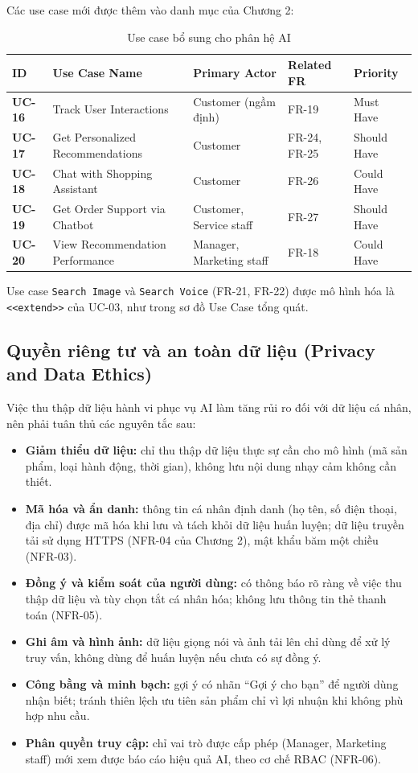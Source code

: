 \documentclass[12pt,a4paper,oneside]{report}
\begin{document}
Các use case mới được thêm vào danh mục của Chương 2:

\begin{longtable}{p{1.6cm}p{5.4cm}p{3.4cm}p{3cm}p{2.6cm}}
\caption{Use case bổ sung cho phân hệ AI}\\
\toprule
\textbf{ID} & \textbf{Use Case Name} & \textbf{Primary Actor} & \textbf{Related FR} & \textbf{Priority} \\
\midrule
\endhead
\bottomrule
\endlastfoot
\textbf{UC-16} & Track User Interactions & Customer (ngầm định) & FR-19 & Must Have \\
\textbf{UC-17} & Get Personalized Recommendations & Customer & FR-24, FR-25 & Should Have \\
\textbf{UC-18} & Chat with Shopping Assistant & Customer & FR-26 & Could Have \\
\textbf{UC-19} & Get Order Support via Chatbot & Customer, Service staff & FR-27 & Should Have \\
\textbf{UC-20} & View Recommendation Performance & Manager, Marketing staff & FR-18 & Could Have \\
\end{longtable}

Use case \texttt{Search Image} và \texttt{Search Voice} (FR-21, FR-22) được mô hình hóa là \texttt{<<extend>>} của UC-03, như trong sơ đồ Use Case tổng quát.

\subsection{Quyền riêng tư và an toàn dữ liệu (Privacy and Data Ethics)}

Việc thu thập dữ liệu hành vi phục vụ AI làm tăng rủi ro đối với dữ liệu cá nhân, nên phải tuân thủ các nguyên tắc sau:

\begin{itemize}
  \item \textbf{Giảm thiểu dữ liệu:} chỉ thu thập dữ liệu thực sự cần cho mô hình (mã sản phẩm, loại hành động, thời gian), không lưu nội dung nhạy cảm không cần thiết.
  \item \textbf{Mã hóa và ẩn danh:} thông tin cá nhân định danh (họ tên, số điện thoại, địa chỉ) được mã hóa khi lưu và tách khỏi dữ liệu huấn luyện; dữ liệu truyền tải sử dụng HTTPS (NFR-04 của Chương 2), mật khẩu băm một chiều (NFR-03).
  \item \textbf{Đồng ý và kiểm soát của người dùng:} có thông báo rõ ràng về việc thu thập dữ liệu và tùy chọn tắt cá nhân hóa; không lưu thông tin thẻ thanh toán (NFR-05).
  \item \textbf{Ghi âm và hình ảnh:} dữ liệu giọng nói và ảnh tải lên chỉ dùng để xử lý truy vấn, không dùng để huấn luyện nếu chưa có sự đồng ý.
  \item \textbf{Công bằng và minh bạch:} gợi ý có nhãn ``Gợi ý cho bạn'' để người dùng nhận biết; tránh thiên lệch ưu tiên sản phẩm chỉ vì lợi nhuận khi không phù hợp nhu cầu.
  \item \textbf{Phân quyền truy cập:} chỉ vai trò được cấp phép (Manager, Marketing staff) mới xem được báo cáo hiệu quả AI, theo cơ chế RBAC (NFR-06).
\end{itemize}
\end{document}
